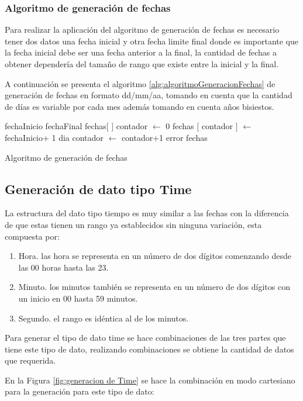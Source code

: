 \subsubsection{Algoritmo de generaci\'on de fechas}
Para realizar la aplicaci\'on del algoritmo de generaci\'on de fechas es necesario tener dos datos una fecha inicial y otra fecha limite final donde es importante que la fecha inicial debe ser una fecha anterior a la final, la cantidad de fechas a obtener depender\'ia del tama\~no de rango que existe entre la inicial y la final.

A continuaci\'on se presenta el algoritmo \ref{alg:algoritmoGeneracionFechas} de generaci\'on de fechas en formato dd/mm/aa, tomando en cuenta que la cantidad de d\'ias es variable por cada mes adem\'as tomando en cuenta a\~nos bisiestos.
\begin{algorithm}[H]
\begin{algorithmic}[1]
\REQUIRE fechaInicio fechaFinal
\STATE fechas$[$ $]$
\STATE contador $\leftarrow$ 0
	\STATE fechas $[$ contador $]$ $\leftarrow$ fechaInicio+ 1 dia
	\STATE contador $\leftarrow$ contador+1
	\ENDWHILE
\ELSE
	\RETURN error
\ENDIF
\RETURN fechas
\end{algorithmic}
\caption{Algoritmo de generaci\'on de fechas}\label{alg:algoritmoGeneracionFechas}
\end{algorithm}
\subsection{Generaci\'on de dato tipo Time}
La estructura del dato tipo tiempo es muy similar a las fechas con la diferencia de que estas tienen un rango ya establecidos sin ninguna variaci\'on, esta compuesta por:
\begin{enumerate}
\item Hora. las hora se representa en un n\'umero de dos d\'igitos comenzando desde las 00 horas hasta las 23.
\item Minuto. los minutos tambi\'en se representa en un n\'umero de dos d\'igitos con un inicio en 00 hasta 59 minutos.
\item Segundo. el rango es id\'entica al de los minutos.
\end{enumerate}
Para generar el tipo de dato time se hace combinaciones de las tres partes que tiene este tipo de dato, realizando combinaciones se obtiene la cantidad de datos que requerida.

En la Figura \ref{fig:generacion de Time} se hace la combinaci\'on en modo cartesiano para la generaci\'on para este tipo de dato:

